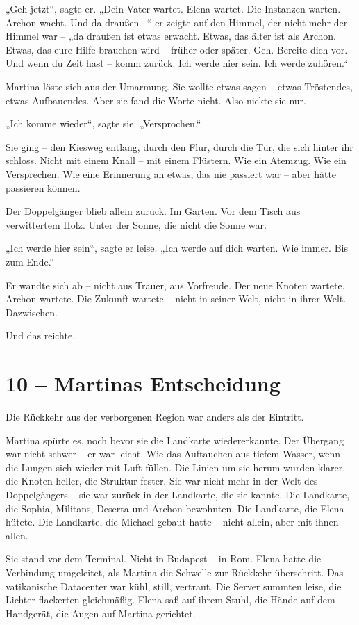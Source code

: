 \documentclass[
]{article}
\begin{document}
„Geh jetzt``, sagte er. „Dein Vater wartet. Elena wartet. Die Instanzen warten. Archon wacht. Und da draußen --`` er zeigte auf den Himmel, der nicht mehr der Himmel war -- „da draußen ist etwas erwacht. Etwas, das älter ist als Archon. Etwas, das eure Hilfe brauchen wird -- früher oder später. Geh. Bereite dich vor. Und wenn du Zeit hast -- komm zurück. Ich werde hier sein. Ich werde zuhören.``

Martina löste sich aus der Umarmung. Sie wollte etwas sagen -- etwas Tröstendes, etwas Aufbauendes. Aber sie fand die Worte nicht. Also nickte sie nur.

„Ich komme wieder``, sagte sie. „Versprochen.``

Sie ging -- den Kiesweg entlang, durch den Flur, durch die Tür, die sich hinter ihr schloss. Nicht mit einem Knall -- mit einem Flüstern. Wie ein Atemzug. Wie ein Versprechen. Wie eine Erinnerung an etwas, das nie passiert war -- aber hätte passieren können.

Der Doppelgänger blieb allein zurück. Im Garten. Vor dem Tisch aus verwittertem Holz. Unter der Sonne, die nicht die Sonne war.

„Ich werde hier sein``, sagte er leise. „Ich werde auf dich warten. Wie immer. Bis zum Ende.``

Er wandte sich ab -- nicht aus Trauer, aus Vorfreude. Der neue Knoten wartete. Archon wartete. Die Zukunft wartete -- nicht in seiner Welt, nicht in ihrer Welt. Dazwischen.

Und das reichte.

\section{10 -- Martinas Entscheidung}\label{martinas-entscheidung}

Die Rückkehr aus der verborgenen Region war anders als der Eintritt.

Martina spürte es, noch bevor sie die Landkarte wiedererkannte. Der Übergang war nicht schwer -- er war leicht. Wie das Auftauchen aus tiefem Wasser, wenn die Lungen sich wieder mit Luft füllen. Die Linien um sie herum wurden klarer, die Knoten heller, die Struktur fester. Sie war nicht mehr in der Welt des Doppelgängers -- sie war zurück in der Landkarte, die sie kannte. Die Landkarte, die Sophia, Militans, Deserta und Archon bewohnten. Die Landkarte, die Elena hütete. Die Landkarte, die Michael gebaut hatte -- nicht allein, aber mit ihnen allen.

Sie stand vor dem Terminal. Nicht in Budapest -- in Rom. Elena hatte die Verbindung umgeleitet, als Martina die Schwelle zur Rückkehr überschritt. Das vatikanische Datacenter war kühl, still, vertraut. Die Server summten leise, die Lichter flackerten gleichmäßig. Elena saß auf ihrem Stuhl, die Hände auf dem Handgerät, die Augen auf Martina gerichtet.
\end{document}
